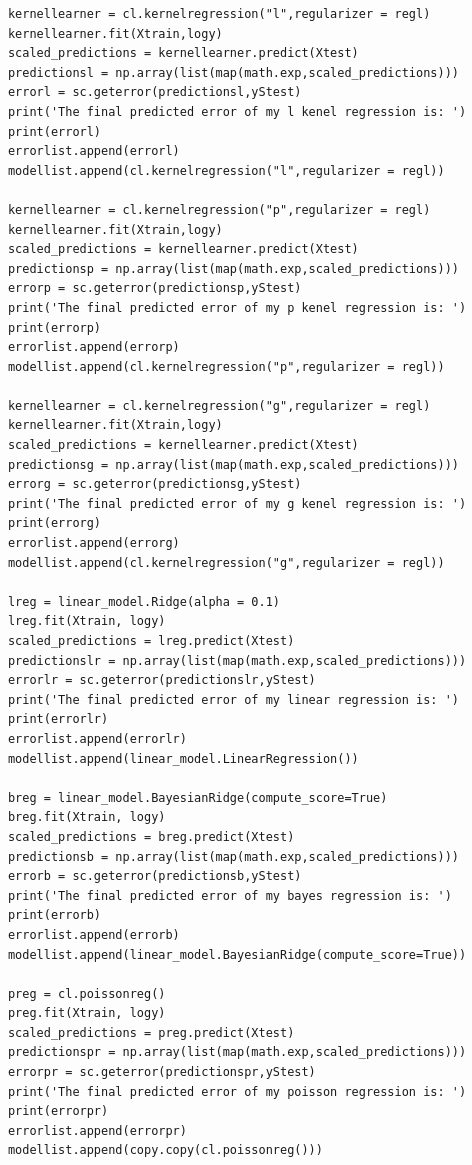 \documentclass[11pt]{article}
\begin{document}
\begin{verbatim}
      kernellearner = cl.kernelregression("l",regularizer = regl)
      kernellearner.fit(Xtrain,logy)
      scaled_predictions = kernellearner.predict(Xtest)
      predictionsl = np.array(list(map(math.exp,scaled_predictions)))
      errorl = sc.geterror(predictionsl,yStest)
      print('The final predicted error of my l kenel regression is: ')
      print(errorl)
      errorlist.append(errorl)
      modellist.append(cl.kernelregression("l",regularizer = regl))
      
      kernellearner = cl.kernelregression("p",regularizer = regl)
      kernellearner.fit(Xtrain,logy)
      scaled_predictions = kernellearner.predict(Xtest)
      predictionsp = np.array(list(map(math.exp,scaled_predictions)))
      errorp = sc.geterror(predictionsp,yStest)
      print('The final predicted error of my p kenel regression is: ')
      print(errorp)
      errorlist.append(errorp)
      modellist.append(cl.kernelregression("p",regularizer = regl))
      
      kernellearner = cl.kernelregression("g",regularizer = regl)
      kernellearner.fit(Xtrain,logy)
      scaled_predictions = kernellearner.predict(Xtest)
      predictionsg = np.array(list(map(math.exp,scaled_predictions)))
      errorg = sc.geterror(predictionsg,yStest)
      print('The final predicted error of my g kenel regression is: ')
      print(errorg)
      errorlist.append(errorg)
      modellist.append(cl.kernelregression("g",regularizer = regl))
      
      lreg = linear_model.Ridge(alpha = 0.1)
      lreg.fit(Xtrain, logy)
      scaled_predictions = lreg.predict(Xtest)
      predictionslr = np.array(list(map(math.exp,scaled_predictions)))
      errorlr = sc.geterror(predictionslr,yStest)
      print('The final predicted error of my linear regression is: ')
      print(errorlr)
      errorlist.append(errorlr)
      modellist.append(linear_model.LinearRegression())
      
      breg = linear_model.BayesianRidge(compute_score=True)
      breg.fit(Xtrain, logy)
      scaled_predictions = breg.predict(Xtest)
      predictionsb = np.array(list(map(math.exp,scaled_predictions)))
      errorb = sc.geterror(predictionsb,yStest)
      print('The final predicted error of my bayes regression is: ')
      print(errorb)
      errorlist.append(errorb)
      modellist.append(linear_model.BayesianRidge(compute_score=True))
      
      preg = cl.poissonreg()
      preg.fit(Xtrain, logy)
      scaled_predictions = preg.predict(Xtest)
      predictionspr = np.array(list(map(math.exp,scaled_predictions)))
      errorpr = sc.geterror(predictionspr,yStest)
      print('The final predicted error of my poisson regression is: ')
      print(errorpr)
      errorlist.append(errorpr)
      modellist.append(copy.copy(cl.poissonreg()))
      

\end{verbatim}
\end{document}
